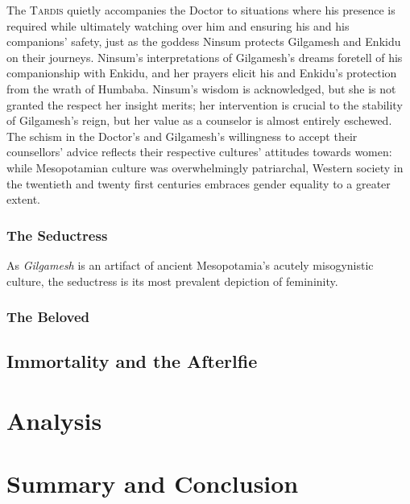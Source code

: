 \documentclass[10pt,a4paper]{article}
\begin{document}
The \textsc{Tardis} quietly accompanies the Doctor to situations where his presence is required while ultimately watching over him and ensuring his and his companions’ safety, just as the goddess Ninsum protects Gilgamesh and Enkidu on their journeys. Ninsum’s interpretations of Gilgamesh’s dreams foretell of his companionship with Enkidu, and her prayers elicit his and Enkidu’s protection from the wrath of Humbaba. Ninsum’s wisdom is acknowledged, but she is not granted the respect her insight merits; her intervention is crucial to the stability of Gilgamesh’s reign, but her value as a counselor is almost entirely eschewed. The schism in the Doctor’s and Gilgamesh’s willingness to accept their counsellors’ advice reflects their respective cultures’ attitudes towards women: while Mesopotamian culture was overwhelmingly patriarchal, Western society in the twentieth and twenty first centuries embraces gender equality to a greater extent.

\subsubsection{The Seductress}
%
%
As \emph{Gilgamesh} is an artifact of ancient Mesopotamia's acutely misogynistic culture, the seductress is its most prevalent depiction of femininity. 


\subsubsection{The Beloved}
%
%

\subsection{Immortality and the Afterlfie}
%
%

\section{Analysis}
%
%
%

\section{Summary and Conclusion}
%
%
\end{document}

